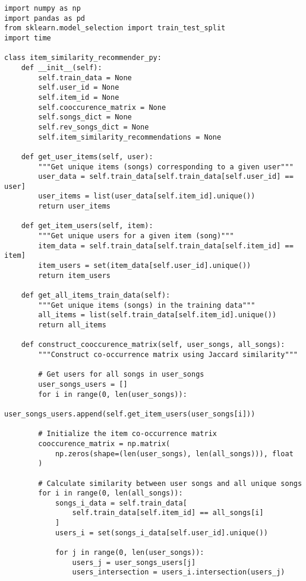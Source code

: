 \documentclass[12pt,a4paper]{article}
\begin{document}
\begin{lstlisting}[caption=Complete Item-Based Collaborative Filtering Implementation]
import numpy as np
import pandas as pd
from sklearn.model_selection import train_test_split
import time

class item_similarity_recommender_py:
    def __init__(self):
        self.train_data = None
        self.user_id = None
        self.item_id = None
        self.cooccurence_matrix = None
        self.songs_dict = None
        self.rev_songs_dict = None
        self.item_similarity_recommendations = None

    def get_user_items(self, user):
        """Get unique items (songs) corresponding to a given user"""
        user_data = self.train_data[self.train_data[self.user_id] == user]
        user_items = list(user_data[self.item_id].unique())
        return user_items

    def get_item_users(self, item):
        """Get unique users for a given item (song)"""
        item_data = self.train_data[self.train_data[self.item_id] == item]
        item_users = set(item_data[self.user_id].unique())
        return item_users

    def get_all_items_train_data(self):
        """Get unique items (songs) in the training data"""
        all_items = list(self.train_data[self.item_id].unique())
        return all_items

    def construct_cooccurence_matrix(self, user_songs, all_songs):
        """Construct co-occurrence matrix using Jaccard similarity"""
        
        # Get users for all songs in user_songs
        user_songs_users = []
        for i in range(0, len(user_songs)):
            user_songs_users.append(self.get_item_users(user_songs[i]))

        # Initialize the item co-occurrence matrix
        cooccurence_matrix = np.matrix(
            np.zeros(shape=(len(user_songs), len(all_songs))), float
        )

        # Calculate similarity between user songs and all unique songs
        for i in range(0, len(all_songs)):
            songs_i_data = self.train_data[
                self.train_data[self.item_id] == all_songs[i]
            ]
            users_i = set(songs_i_data[self.user_id].unique())

            for j in range(0, len(user_songs)):
                users_j = user_songs_users[j]
                users_intersection = users_i.intersection(users_j)


\end{lstlisting}
\end{document}
